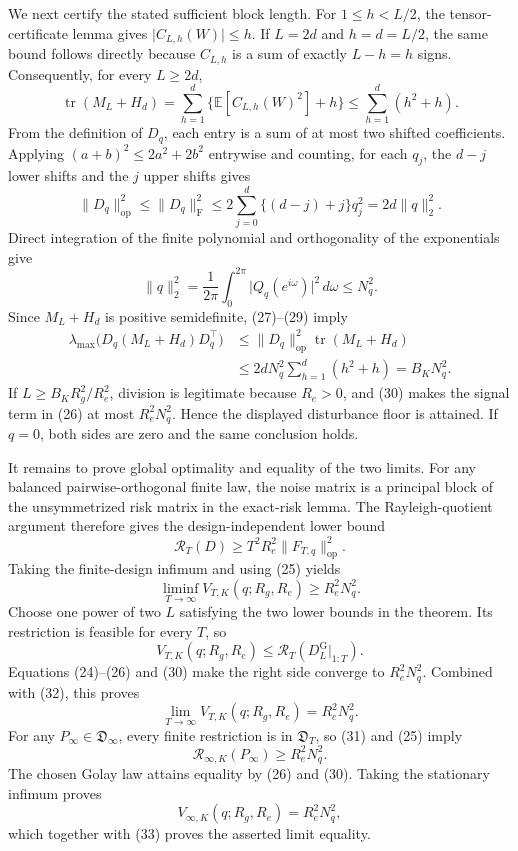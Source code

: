 We next certify the stated sufficient block length.  For \(1\le h< L/2\), the tensor-certificate lemma gives \(\lvert C_{L,h}(W)\rvert\le h\).  If \(L=2d\) and \(h=d=L/2\), the same bound follows directly because \(C_{L,h}\) is a sum of exactly \(L-h=h\) signs.  Consequently, for every \(L\ge2d\),
\[
\operatorname{tr}(M_L+H_d)
=\sum_{h=1}^{d}\{\mathbb E[C_{L,h}(W)^2]+h\}
\le\sum_{h=1}^{d}(h^2+h).
\tag{27}
\]
From the definition of \(D_q\), each entry is a sum of at most two shifted coefficients.  Applying \((a+b)^2\le2a^2+2b^2\) entrywise and counting, for each \(q_j\), the \(d-j\) lower shifts and the \(j\) upper shifts gives
\[
\lVert D_q\rVert_{\mathrm{op}}^2
\le\lVert D_q\rVert_{\mathrm F}^2
\le2\sum_{j=0}^{d}\{(d-j)+j\}q_j^2
=2d\lVert q\rVert_2^2.
\tag{28}
\]
Direct integration of the finite polynomial and orthogonality of the exponentials give
\[
\lVert q\rVert_2^2
=\frac1{2\pi}\int_0^{2\pi}\lvert Q_q(e^{i\omega})\rvert^2\,d\omega
\le N_q^2.
\tag{29}
\]
Since \(M_L+H_d\) is positive semidefinite, (27)--(29) imply
\[
\begin{aligned}
\lambda_{\max}\!\bigl(D_q(M_L+H_d)D_q^{\top}\bigr)
&\le\lVert D_q\rVert_{\mathrm{op}}^2\operatorname{tr}(M_L+H_d)\\
&\le2dN_q^2\sum_{h=1}^{d}(h^2+h)
=B_KN_q^2.
\end{aligned}
\tag{30}
\]
If \(L\ge B_KR_g^2/R_e^2\), division is legitimate because \(R_e>0\), and (30) makes the signal term in (26) at most \(R_e^2N_q^2\).  Hence the displayed disturbance floor is attained.  If \(q=0\), both sides are zero and the same conclusion holds.

It remains to prove global optimality and equality of the two limits.  For any balanced pairwise-orthogonal finite law, the noise matrix is a principal block of the unsymmetrized risk matrix in the exact-risk lemma.  The Rayleigh-quotient argument therefore gives the design-independent lower bound
\[
\mathcal R_T(D)\ge T^2R_e^2\lVert F_{T,q}\rVert_{\mathrm{op}}^2.
\tag{31}
\]
Taking the finite-design infimum and using (25) yields
\[
\liminf_{T\to\infty}V_{T,K}(q;R_g,R_e)\ge R_e^2N_q^2.
\tag{32}
\]
Choose one power of two \(L\) satisfying the two lower bounds in the theorem.  Its restriction is feasible for every \(T\), so
\[
V_{T,K}(q;R_g,R_e)\le\mathcal R_T(D_L^{\mathrm G}|_{1:T}).
\]
Equations (24)--(26) and (30) make the right side converge to \(R_e^2N_q^2\).  Combined with (32), this proves
\[
\lim_{T\to\infty}V_{T,K}(q;R_g,R_e)=R_e^2N_q^2.
\tag{33}
\]
For any \(P_{\infty}\in\mathfrak D_{\infty}\), every finite restriction is in \(\mathfrak D_T\), so (31) and (25) imply
\[
\mathcal R_{\infty,K}(P_{\infty})\ge R_e^2N_q^2.
\]
The chosen Golay law attains equality by (26) and (30).  Taking the stationary infimum proves
\[
V_{\infty,K}(q;R_g,R_e)=R_e^2N_q^2,
\]
which together with (33) proves the asserted limit equality.

